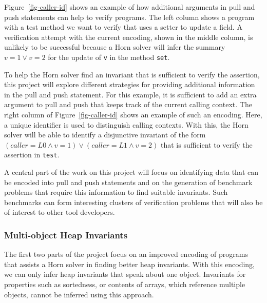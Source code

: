 Figure~\ref{fig-caller-id} shows an example of how additional arguments in
pull and push statements can help to verify programs. The left column shows
a program with a test method we want to verify that uses a setter to update a field. A verification attempt with the 
current encoding, shown in the middle column, is unlikely to be successful 
because a Horn solver will infer the summary $v=1 \vee v=2$ for the update of
\texttt{v} in the method \texttt{set}. 

To help the Horn solver find an invariant that is sufficient to verify 
the assertion, this project will explore different strategies for providing 
additional information in the pull and push statement. For this example, it is 
sufficient to add an extra argument to pull and push that keeps track of the
current calling context. The right column of Figure~\ref{fig-caller-id} shows
an example of such an encoding. Here, a unique identifier is used to distinguish
calling contexts. With this, the Horn solver will be able to identify a 
disjunctive invariant of the form 
$(caller=L0\wedge v=1) \vee (caller=L1\wedge v=2)$ that is sufficient to
verify the assertion in \texttt{test}.

A central part of the work on this project will focus on identifying data
that can be encoded into pull and push statements and on the generation of
benchmark problems that require this information to find suitable invariants.
Such benchmarks can form interesting clusters of verification problems that
will also be of interest to other tool developers.



\subsubsection{Multi-object Heap Invariants}
The first two parts of the project focus on an improved encoding of 
programs that assists a Horn solver in finding better 
heap invariants. With this encoding, we can only infer heap 
invariants that speak about one object. Invariants for properties 
such as sortedness, or contents of arrays, which reference multiple
objects, cannot be inferred using this approach.

